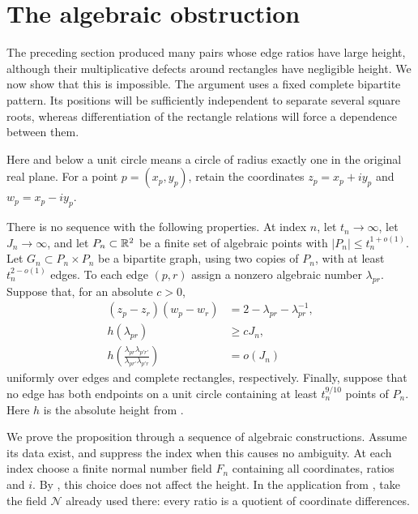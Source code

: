 \section{The algebraic obstruction}\label{sec:algebra}

The preceding section produced many pairs whose edge ratios have large
height, although their multiplicative defects around rectangles have
negligible height. We now show that this is impossible. The argument uses
a fixed complete bipartite pattern. Its positions will be sufficiently
independent to separate several square roots, whereas differentiation of
the rectangle relations will force a dependence between them.

Here and below a unit circle means a circle of radius exactly one in the
original real plane. For a point \(p=(x_p,y_p)\), retain the coordinates
\(z_p=x_p+iy_p\) and \(w_p=x_p-iy_p\).

\begin{proposition}
\label{alg:obstruction}
There is no sequence with the following properties. At index \(n\), let
\(t_n\to\infty\), let \(J_n\to\infty\), and let
\(P_n\subset\mathbb R^2\) be a finite set of algebraic points with
\(\lvert P_n\rvert\le t_n^{1+o(1)}\). Let
\(G_n\subset P_n\times P_n\) be a bipartite graph, using two copies of
\(P_n\), with at least \(t_n^{2-o(1)}\) edges. To each edge \((p,r)\)
assign a nonzero algebraic number \(\lambda_{pr}\). Suppose that, for an
absolute \(c>0\),
\begin{align}
 (z_p-z_r)(w_p-w_r)
   &=2-\lambda_{pr}-\lambda_{pr}^{-1},
       \label{alg:distance}\\
 h(\lambda_{pr})&\ge cJ_n,
       \label{alg:large-height}\\
 h\left(\frac{\lambda_{pr}\lambda_{p'r'}}
                 {\lambda_{pr'}\lambda_{p'r}}\right)&=o(J_n)
       \label{alg:rectangle}
\end{align}
uniformly over edges and complete rectangles, respectively. Finally,
suppose that no edge has both endpoints on a unit circle containing at
least \(t_n^{9/10}\) points of \(P_n\). Here \(h\) is the absolute height
from .
\end{proposition}

We prove the proposition through a sequence of algebraic constructions.
Assume its data exist, and suppress the index when this causes no
ambiguity. At each index choose a finite normal number field \(F_n\)
containing all coordinates, ratios and \(i\). By , this
choice does not affect the height. In the application from
, take the field \(\mathcal N\) already used there:
every ratio is a quotient of coordinate differences.

